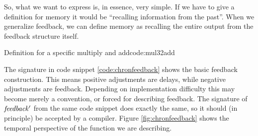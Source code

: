 So, what we want to express is, in essence, very simple.
If we have to give a definition for memory it would be ``recalling information from the past''. 
When we generalize feedback, we can define memory as recalling the entire output from the feedback structure itself.
\begin{texexptitled}{Definition for a specific multiply and add}{code:mul32add}
\begin{hscode}\SaveRestoreHook
{}%
%
\>[B]{}\mathbin{::}\langle{}\rangle\to {}\langle{}\mathbin{-}\rangle\to {}\langle{}\rangle{}\<[E]%
\ColumnHook
\end{hscode}\resethooks
\begin{hscode}\SaveRestoreHook
{}%
%
\>[B]{}\mathbin{::}\langle{}\mathbin{+}\rangle\to {}\langle{}\rangle\to {}\langle{}\mathbin{+}\rangle{}\<[E]%
\ColumnHook
\end{hscode}\resethooks
\end{texexptitled}
The signature in code snippet \ref{code:chronfeedback} shows the basic feedback construction. 
This means positive adjustments are delays, while negative adjustments are feedback.
Depending on implementation difficulty this may become merely a convention, or forced for describing feedback.
The signature of \ensuremath{\Varid{feedback'}} from the same code snippet does exactly the same, so it should (in principle) be accepted by a compiler.
Figure \ref{fig:chronfeedback} shows the temporal perspective of the function we are describing.
\begin{figure}
\centering
{}
\end{figure}

